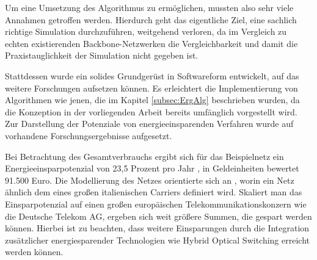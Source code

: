 Um eine Umsetzung des Algorithmus zu ermöglichen, mussten also sehr viele Annahmen getroffen werden. Hierdurch geht das eigentliche Ziel, eine sachlich richtige Simulation durchzuführen, weitgehend verloren, da im Vergleich zu echten existierenden Backbone-Netzwerken die Vergleichbarkeit und damit die Praxistauglichkeit der Simulation nicht gegeben ist.

Stattdessen wurde ein solides Grundgerüst in Softwareform entwickelt, auf das weitere Forschungen aufsetzen können. Es erleichtert die Implementierung von Algorithmen wie jenen, die im Kapitel \ref{subsec:ErgAlg} beschrieben wurden, da die Konzeption in der vorliegenden Arbeit bereits umfänglich vorgestellt wird. Zur Darstellung der Potenziale von energieeinsparenden Verfahren wurde auf vorhandene Forschungsergebnisse aufgesetzt.

Bei Betrachtung des Gesamtverbrauchs ergibt sich für das Beispielnetz ein Energieeinsparpotenzial von 23,5 Prozent pro Jahr  \cite[5]{Chiaraviglio2009}, in Geldeinheiten\cite{Proteus2016} bewertet 91.500 Euro. Die Modellierung des Netzes orientierte sich an \cite{Chiaraviglio2009}, worin ein Netz ähnlich dem eines großen italienischen Carriers definiert wird. Skaliert man das Einsparpotenzial auf einen großen europäischen Telekommunikationskonzern wie die Deutsche Telekom AG, ergeben sich weit größere Summen, die gespart werden können. Hierbei ist zu beachten, dass weitere Einsparungen durch die Integration zusätzlicher energiesparender Technologien wie Hybrid Optical Switching erreicht werden können.
